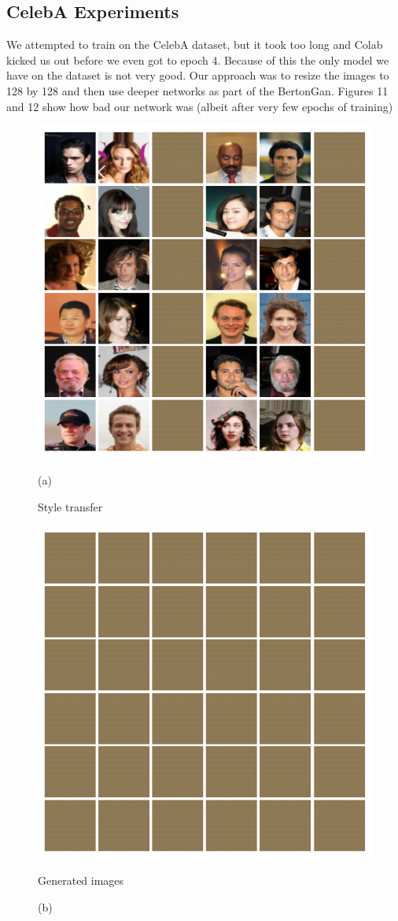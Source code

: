 \documentclass{article}
\begin{document}
\clearpage

\subsection{CelebA Experiments}

We attempted to train on the CelebA dataset, but it took too long and Colab kicked us out before we even got to epoch 4. Because of this the only model we have on the dataset is not very good. Our approach was to resize the images to 128 by 128 and then use deeper networks as part of the BertonGan. Figures 11 and 12 show how bad our network was (albeit after very few epochs of training)

\begin{figure}[hbt]
	\centering
	\begin{minipage}{.5\textwidth}
		\centering
		\includegraphics[width=.8\linewidth]{images/celeba_transfer.png}
		\caption{(a)}{Style transfer}
		\label{fig:sub1}
	\end{minipage}%
	\begin{minipage}{.5\textwidth}
		\centering
		\includegraphics[width=.8\linewidth]{images/celeba_generated.png}
		\caption{(b)}{Generated images}
		\label{fig:sub2}
	\end{minipage}
\end{figure}
\end{document}
